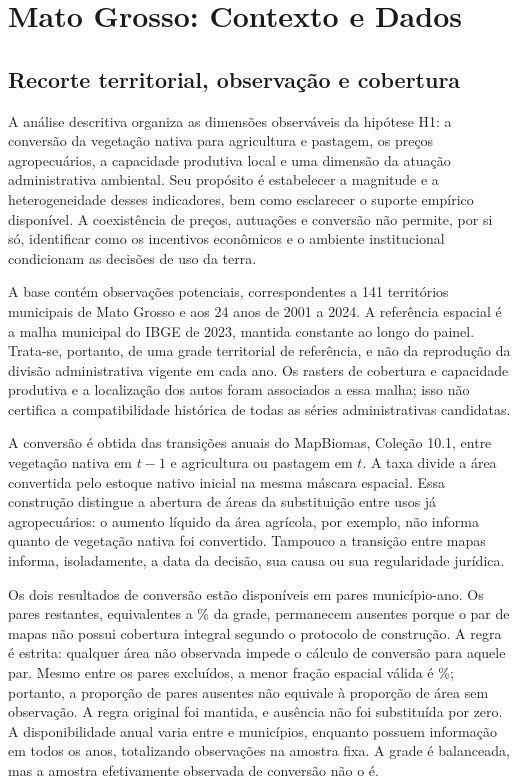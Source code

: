 \section{Mato Grosso: Contexto e Dados}
\label{sec:dados}



\subsection{Recorte territorial, observação e cobertura}

A análise descritiva organiza as dimensões observáveis da hipótese H1: a conversão da vegetação nativa para agricultura e pastagem, os preços agropecuários, a capacidade produtiva local e uma dimensão da atuação administrativa ambiental. Seu propósito é estabelecer a magnitude e a heterogeneidade desses indicadores, bem como esclarecer o suporte empírico disponível. A coexistência de preços, autuações e conversão não permite, por si só, identificar como os incentivos econômicos e o ambiente institucional condicionam as decisões de uso da terra.

A base contém \Hobs{} observações potenciais, correspondentes a 141 territórios municipais de Mato Grosso e aos 24 anos de 2001 a 2024. A referência espacial é a malha municipal do IBGE de 2023, mantida constante ao longo do painel. Trata-se, portanto, de uma grade territorial de referência, e não da reprodução da divisão administrativa vigente em cada ano. Os rasters de cobertura e capacidade produtiva e a localização dos autos foram associados a essa malha; isso não certifica a compatibilidade histórica de todas as séries administrativas candidatas.

A conversão é obtida das transições anuais do MapBiomas, Coleção 10.1, entre vegetação nativa em $t-1$ e agricultura ou pastagem em $t$. A taxa divide a área convertida pelo estoque nativo inicial na mesma máscara espacial. Essa construção distingue a abertura de áreas da substituição entre usos já agropecuários: o aumento líquido da área agrícola, por exemplo, não informa quanto de vegetação nativa foi convertido. Tampouco a transição entre mapas informa, isoladamente, a data da decisão, sua causa ou sua regularidade jurídica.

Os dois resultados de conversão estão disponíveis em \Hvalid{} pares município-ano. Os \Hmissing{} pares restantes, equivalentes a \HmissingPct{}\% da grade, permanecem ausentes porque o par de mapas não possui cobertura integral segundo o protocolo de construção. A regra é estrita: qualquer área não observada impede o cálculo de conversão para aquele par. Mesmo entre os pares excluídos, a menor fração espacial válida é \HminFracExcl{}\%; portanto, a proporção de pares ausentes não equivale à proporção de área sem observação. A regra original foi mantida, e ausência não foi substituída por zero. A disponibilidade anual varia entre \HnMin{} e \HnMax{} municípios, enquanto \Hfixed{} possuem informação em todos os anos, totalizando \HfixedObs{} observações na amostra fixa. A grade é balanceada, mas a amostra efetivamente observada de conversão não o é.

